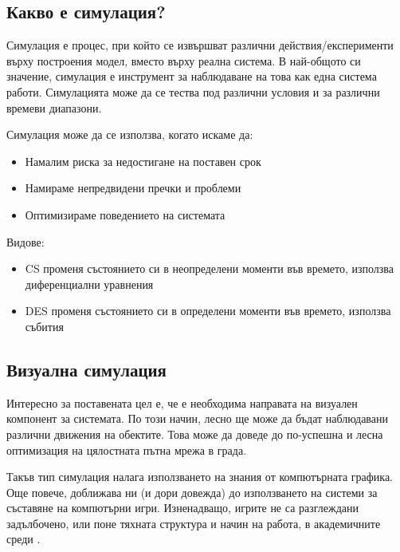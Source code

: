 	\subsection{Какво е симулация?}
	
		Симулация е процес, при който се извършват различни действия/експерименти върху построения модел, 
		вместо върху реална система. В най-общото си значение, симулация е инструмент за наблюдаване на това
		как една система работи. Симулацията може да се тества под различни условия и за различни времеви диапазони.
		
		Симулация може да се използва, когато искаме да:
		
		\begin{itemize}		
			\item Намалим риска за недостигане на поставен срок					
 			\item Намираме непредвидени пречки и проблеми 			
 			\item Оптимизираме поведението на системата 			
		\end{itemize}
		
		Видове:
		
		\begin{itemize}
		
			\item \ac{CS} променя състоянието си в неопределени моменти във времето,
			 използва диференциални уравнения
			 
			\item \ac{DES} променя състоянието си в определени моменти във
			 времето, използва събития
			 
		\end{itemize}
		
	\subsection{Визуална симулация}
	
		Интересно за поставената цел е, че е необходима направата на визуален компонент за системата.
		По този начин, лесно ще може да бъдат наблюдавани различни движения на обектите. Това може да 
		доведе до по-успешна и лесна оптимизация на цялостната пътна мрежа в града.
		
		Такъв тип симулация налага използването на знания от компютърната графика. 
		Още повече, доближава ни (и дори довежда) до използването на системи за съставяне на компютърни игри. 
		Изненадващо, игрите не са разглеждани задълбочено, или поне тяхната структура и начин на работа, 
		в академичните среди \cite{Holzkorn}.
		
